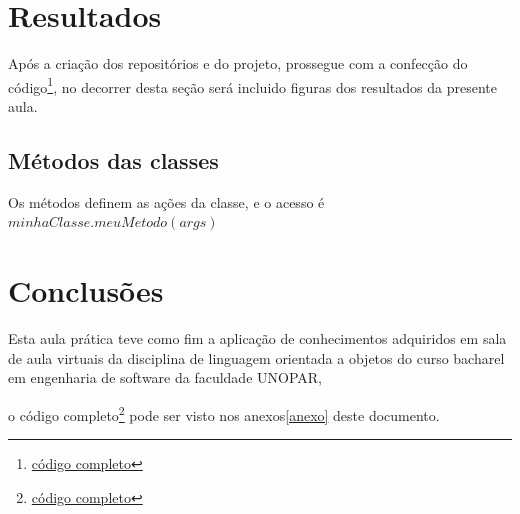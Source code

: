 \section{Resultados}

\par Após a criação dos repositórios e do projeto, prossegue com a confecção do código\footnote{\hyperref[anexo]{código completo}}, no decorrer desta seção será incluido figuras dos resultados da presente aula.




\subsection{Métodos das classes}

\par Os métodos definem as ações da classe, e o acesso é $minhaClasse.meuMetodo(args)$







\section{Conclusões}

\par Esta aula prática teve como fim a aplicação de conhecimentos adquiridos em sala de aula virtuais da disciplina de linguagem orientada a objetos do curso bacharel em engenharia de software da faculdade UNOPAR,

o código completo\footnote{\hyperref[anexo]{código completo}}  pode ser visto nos anexos\ref{anexo} deste documento.


